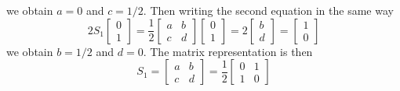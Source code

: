 \documentclass[../../../main.tex]{subfiles}
\begin{document}
we obtain $a=0$ and $c=1/2$.
Then writing the second equation in the same way 
\begin{equation*}
2S_1 \begin{bmatrix}
0 \\
1 
\end{bmatrix}  = 
\frac{1 }{2}
\begin{bmatrix}
a & b \\
c & d 
\end{bmatrix}  \begin{bmatrix}
0 \\
1 
\end{bmatrix}  =
2
\begin{bmatrix}
b \\
d 
\end{bmatrix} 
= 
\begin{bmatrix}
1 \\
0 
\end{bmatrix} 
\end{equation*}
we obtain $b=1/2$ and $d=0$.
The matrix representation is then 
\begin{equation*}
    S_1 = 
\begin{bmatrix}
a & b \\
c & d 
\end{bmatrix}=
\frac{1  }{2}
\begin{bmatrix}
0 & 1 \\
1 & 0 
\end{bmatrix}
\end{equation*}
\end{document}
